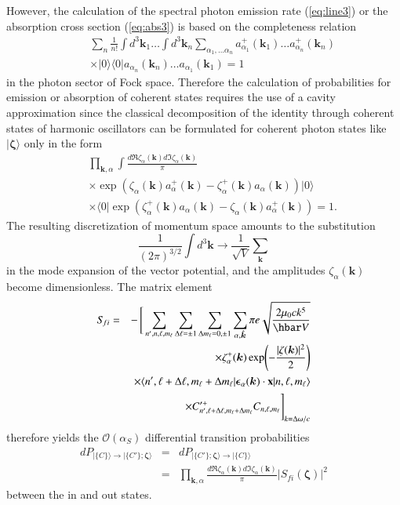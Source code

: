\documentclass[final,3p,12pt]{elsarticle3}
\begin{document}
However, the calculation of the spectral photon emission rate
(\ref{eq:line3}) or the absorption cross section (\ref{eq:abs3})
is based on the completeness relation
\begin{eqnarray*}
&&\!\!\!\sum_n\frac{1}{n!}
\int\!d^3\bm{k}_1\ldots\int\!d^3\bm{k}_n
\sum_{\alpha_1,\ldots\alpha_n}a_{\alpha_1}^+(\bm{k}_1)\ldots a_{\alpha_n}^+(\bm{k}_n)
\\
&&\times\bm{|}0\bm{\rangle}
\bm{\langle} 0\bm{|} a_{\alpha_n}(\bm{k}_n)\ldots a_{\alpha_1}(\bm{k}_1)
=1
\end{eqnarray*}
in the photon sector of Fock space. Therefore the calculation of probabilities
for emission or absorption of coherent states requires the use of a cavity 
approximation since the classical decomposition of the identity through coherent 
states of harmonic oscillators can be formulated for coherent photon states
like $\bm{|}\bm{\zeta}\bm{\rangle}$ only in the form
\begin{eqnarray}\nonumber
&&\!\!\!\prod_{\bm{k},\alpha}\int\frac{d\Re\zeta_\alpha(\bm{k})
d\Im\zeta_\alpha(\bm{k})}{\pi}
\\ \nonumber
&&\times\exp\!\left(\zeta_\alpha(\bm{k})a_{\alpha}^+(\bm{k})
-\zeta_{\alpha}^+(\bm{k})a_\alpha(\bm{k})\right)
\bm{|}0\bm{\rangle}
\\ \label{eq:complete2}
&&\times
\bm{\langle} 0\bm{|}\exp\!\left(\zeta^+_\alpha(\bm{k})a_{\alpha}(\bm{k})
-\zeta_{\alpha}(\bm{k})a^+_\alpha(\bm{k})\right)=1.
\end{eqnarray}
The resulting discretization of momentum space amounts to the
substitution 
\[
\frac{1}{(2\pi)^{3/2}}\int\!d^3\bm{k}\to\frac{1}{\sqrt{V}}\sum_{\bm{k}}
\]
in the mode expansion of the vector potential,
and the amplitudes $\zeta_\alpha(\bm{k})$ become dimensionless.
The matrix element
\begin{eqnarray}\nonumber
S_{\!fi}&=&-\,\Bigg[\sum_{n',n,\ell,m_\ell}\sum_{\Delta\ell=\pm 1}\sum_{\Delta m_\ell=0,\pm 1}
\sum_{\alpha,\hat{\bm{k}}} \pi e\sqrt{\frac{2\mu_0 ck^5}{\hbar V}}
\\ \nonumber
&&\times
\zeta^+_\alpha(\bm{k})
\exp\!\left(-\frac{|\zeta(\bm{k})|^2}{2}\right)
\\ \nonumber
&&\times
\langle n',\ell+\Delta\ell,m_\ell+\Delta m_\ell|
\bm{\epsilon}_\alpha(\bm{k})\cdot\mathrm{\bf x}|n,\ell,m_\ell\rangle
\\ \label{eq:linec4}
&&\times
C'^+_{n',\ell+\Delta\ell,m_\ell+\Delta m_\ell}C_{n,\ell,m_\ell}\Bigg]_{k=\Delta\omega/c}
\end{eqnarray}
therefore yields the $\mathcal{O}(\alpha_S)$ differential
transition probabilities
\begin{eqnarray}\nonumber
dP_{\bm{|}\{C\}\bm{\rangle}\to\bm{|}\{C'\};\bm{\zeta}\bm{\rangle}}&=&
dP_{\bm{|}\{C'\};\bm{\zeta}\bm{\rangle}\to\bm{|}\{C\}\bm{\rangle}}
\\ \label{eq:Pfi}
&=&\prod_{\bm{k},\alpha}\!\frac{d\Re\zeta_\alpha(\bm{k})
d\Im\zeta_\alpha(\bm{k})}{\pi}\!\left|S_{\!fi}(\bm{\zeta})\right|^2
\end{eqnarray}
between the in and out states.
\end{document}
